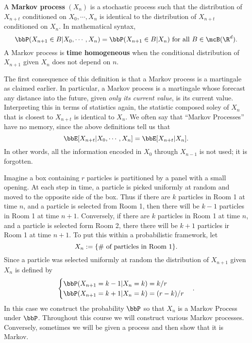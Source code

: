 \documentclass{report}
\begin{document}
A \textbf{Markov process}  $(X_n)$ is a stochastic process such that the distribution of $X_{n+t}$ conditioned on $X_0, \cdots, X_n$ is identical to the distribution of $X_{n+t}$ conditioned on $X_n$.  In mathematical syntax,
\[
\bbP(X_{n+1} \in B | X_0, \cdots, X_n) = \bbP(X_{n+1} \in B | X_n) \textmd{ for all } B \in \mcB(\R^d).
\]
A Markov process is  \textbf{time homogeneous} when the conditional distribution of $X_{n+1}$ given $X_n$ does not depend on $n$.

The first consequence of this definition is that a Markov process is a martingale as claimed earlier.  In particular, a Markov process is a martingale whose forecast any distance into the future, given \emph{only its current value}, is its current value.  Interpreting this in terms of statistics again, the  statistic composed soley of $X_n$ that is closest to $X_{n+t}$ is identical to $X_n$.  We often say that ``Markov Processes'' have no memory, since the above definitions tell us that
\[
\bbE[X_{n+t} | X_0, \cdots, X_n] = \bbE[X_{n+t} | X_n ].
\]
In other words, all the information encoded in $X_0$ through $X_{n-1}$ is not used; it is forgotten.

\begin{example}
Imagine a box containing $r$ particles is partitioned by a panel with a small opening.  At each step in time, a particle is picked uniformly at random and moved to the opposite side of the box.  Thus if there are $k$ particles in Room 1 at time $n$, and a particle is selected from Room 1, then there will be $k-1$ particles in Room 1 at time $n+1$.  Conversely, if there are $k$ particles in Room 1 at time $n$, and a particle is selected form Room 2, there there will be $k+1$ particles ir Room 1 at time $n+1$.  To put this within a probabilistic framework, let
\[
X_n := \{ \# \textmd{ of particles in Room 1} \}.
\]
Since a particle was selected uniformly at random the  distribution of $X_{n+1}$ given $X_n$ is defined by
\[
\begin{cases}
\bbP(X_{n+1} = k-1 | X_n = k) = k/r \\
\bbP(X_{n+1} = k+1 | X_n = k) = (r-k)/r
\end{cases}.
\]
In this case we construct the probability $\bbP$ so that $X_n$ is a Markov Process under $\bbP$.  Throughout this course we will construct various Markov processes.  Conversely, sometimes we will be given a process and then show that it is Markov.
\end{example}
\end{document}
